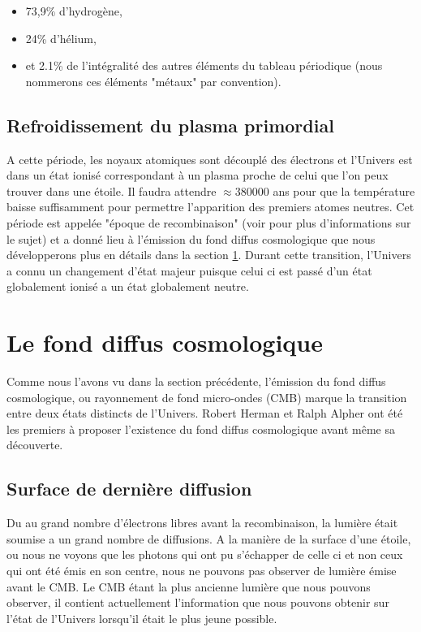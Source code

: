 \begin{itemize}
\item 73,9\% d’hydrogène,
\item 24\% d’hélium,
\item et 2.1\% de l'intégralité des autres éléments du tableau périodique  (nous nommerons ces éléments "métaux" par convention).
\end{itemize}

\subsection{Refroidissement du plasma primordial}
A cette période, les noyaux atomiques sont découplé des électrons et l'Univers est dans un état ionisé correspondant à un plasma proche de celui que l'on peux trouver dans une étoile.
Il faudra attendre $\approx 380 000$ ans pour que la température baisse suffisamment pour permettre l'apparition des premiers atomes neutres.
Cet période est appelée "époque de recombinaison" (voir \cite{2009AN....330..657S} pour plus d'informations sur le sujet) et a donné lieu à l'émission du fond diffus cosmologique que nous développerons plus en détails dans la section \ref{sec:CMB}.
Durant cette transition, l'Univers a connu un changement d'état majeur puisque celui ci est passé d'un état globalement ionisé a un état globalement neutre.

\section{Le fond diffus cosmologique}
\label{sec:CMB}

Comme nous l'avons vu dans la section précédente, l’émission du fond diffus cosmologique, ou rayonnement de fond micro-ondes (\ac{CMB}) marque la transition entre deux états distincts de l'Univers.
Robert Herman et Ralph Alpher ont été les premiers à proposer l’existence du fond diffus cosmologique avant même sa découverte.

\subsection{Surface de dernière diffusion}

Du au grand nombre d'électrons libres avant la recombinaison, la lumière était soumise a un grand nombre de diffusions.
A la manière de la surface d'une étoile, ou nous ne voyons que les photons qui ont pu s’échapper de celle ci et non ceux qui ont été émis en son centre, nous ne pouvons pas observer de lumière émise avant le \ac{CMB}.
Le \ac{CMB} étant la plus ancienne lumière que nous pouvons observer, il contient actuellement l'information que nous pouvons obtenir sur l'état de l'Univers lorsqu'il était le plus jeune possible.

